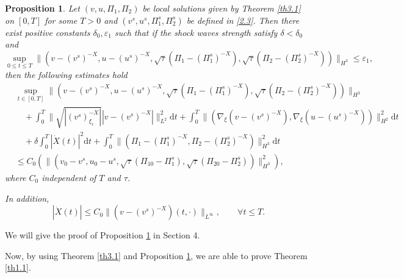 \documentclass[10pt,reqno]{amsart}
\numberwithin{equation}{section}
\newtheorem{prop}{Proposition}[section]
\newcommand{\dif}{\mathrm{d}}
\begin{document}
\begin{prop}\label{p1}
Let $(v, u, \Pi_1, \Pi_2)$ be local solutions given by Theorem \ref{th3.1} on $[0,T]$ for some $T>0$ and $( v^s,  u^s, \Pi^s_1, \Pi^s_{2})$ be defined in \eqref{2.3}. Then there exist positive constants $\delta_0,\varepsilon_1$ such that if the shock waves strength satisfy $\delta<\delta_0$ and
\begin{equation}\label{3.4}
\sup_{0\le t\le T} \|(v-(v^s)^{-X}, u-(u^s)^{-X}, \sqrt{\tau}(\Pi_1-(\Pi^s_1)^{-X}), \sqrt{\tau}(\Pi_2-(\Pi^s_2)^{-X}))\|_{H^3}\leq\varepsilon_1,
\end{equation}
then the following estimates hold
\begin{equation}\label{3.5}
\begin{aligned}
&\sup\limits_{t\in[0, T]}\|(v-(v^s)^{-X}, u-(u^s)^{-X}, \sqrt{\tau}(\Pi_1-(\Pi^s_1)^{-X}), \sqrt{\tau}(\Pi_2-(\Pi^s_2)^{-X}))\|_{H^3}\\
&\quad+\int_0^{T}\|\sqrt{|(v^s)^{-X}_{\xi_1}|}|v-(v^s)^{-X}|\|_{L^2}^2\dif t
+\int_0^{T}\|\left(\nabla_\xi(v-(v^s)^{-X}),\nabla_\xi (u-(u^s)^{-X})\right)\|^2_{H^2}\dif t
\\
&\quad+\delta\int_0^{T}|\dot X(t)|^2\dif t
+\int_0^{T}\|(\Pi_1-(\Pi_1^s)^{-X}, \Pi_2-(\Pi_2^s)^{-X})\|^2_{H^3}\dif t\\
&\leq C_0\left(\|(v_0-v^s, u_0-u^s, \sqrt{\tau}(\Pi_{10}-\Pi_1^s), \sqrt{\tau}(\Pi_{20}-\Pi_2^s))\|^2_{H^3}\right),
\end{aligned}
\end{equation}
where $C_0$ independent of $T$ and $\tau$.

In addition, 
\begin{equation}\label{3.6}
|\dot{X}(t)|\leq C_0\|(v-(v^s)^{-X})(t,\cdot)\|_{L^{\infty}},\qquad\forall t\leq T.
\end{equation}
\end{prop}

We will give the proof of Proposition \ref{p1} in Section 4.

Now, by using Theorem \ref{th3.1} and Proposition \ref{p1}, we are able to prove Theorem \ref{th1.1}.
\end{document}
